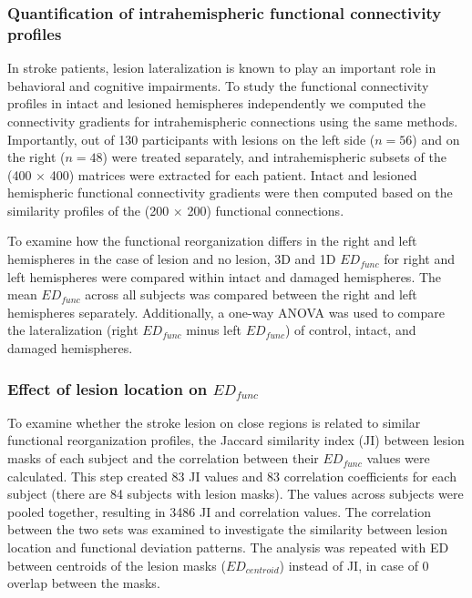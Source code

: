 \documentclass[fleqn,10pt]{wlscirep}
\begin{document}
\subsubsection*{Quantification of intrahemispheric functional connectivity profiles}

In stroke patients, lesion lateralization is known to play an important role in behavioral and cognitive impairments. To study the functional connectivity profiles in intact and lesioned hemispheres independently we computed the connectivity gradients for intrahemispheric connections using the same methods. Importantly, out of 130 participants with lesions on the left side ($n = 56$) and on the right ($n = 48$) were treated separately, and intrahemispheric subsets of the (400 $\times$ 400) matrices were extracted for each patient. Intact and lesioned hemispheric functional connectivity gradients were then computed based on the similarity profiles of the (200 $\times$ 200) functional connections.

To examine how the functional reorganization differs in the right and left hemispheres in the case of lesion and no lesion, 3D and 1D $\textit{ED}_{{func}}$ for right and left hemispheres were compared within intact and damaged hemispheres. The mean $\textit{ED}_{{func}}$ across all subjects was compared between the right and left hemispheres separately. Additionally, a one-way ANOVA was used to compare the lateralization (right \(\textit{ED}_{{func}}\) minus left \(\textit{ED}_{{func}}\)) of control, intact, and damaged hemispheres.

\subsubsection*{Effect of lesion location on $\textit{ED}_{{func}}$}
To examine whether the stroke lesion on close regions is related to similar functional reorganization profiles,  the Jaccard similarity index (JI) between lesion masks of each subject and the correlation between their $\textit{ED}_{{func}}$ values were calculated. This step created 83 JI values and 83 correlation coefficients for each subject (there are 84 subjects with lesion masks). The values across subjects were pooled together, resulting in 3486 JI and correlation values. The correlation between the two sets was examined to investigate the similarity between lesion location and functional deviation patterns. The analysis was repeated with ED between centroids of the lesion masks ($\textit{ED}_{{centroid}}$) instead of JI, in case of 0 overlap between the masks.
    
\end{document}
